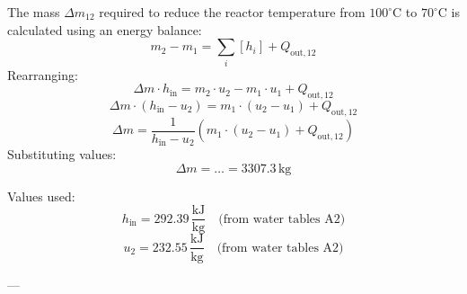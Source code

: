 The mass \( \Delta m_{12} \) required to reduce the reactor temperature from \( 100^\circ\text{C} \) to \( 70^\circ\text{C} \) is calculated using an energy balance:  
\[
m_2 - m_1 = \sum_i \left[ h_i \right] + Q_{\text{out},12}
\]  
Rearranging:  
\[
\Delta m \cdot h_{\text{in}} = m_2 \cdot u_2 - m_1 \cdot u_1 + Q_{\text{out},12}
\]  
\[
\Delta m \cdot \left( h_{\text{in}} - u_2 \right) = m_1 \cdot \left( u_2 - u_1 \right) + Q_{\text{out},12}
\]  
\[
\Delta m = \frac{1}{h_{\text{in}} - u_2} \left( m_1 \cdot \left( u_2 - u_1 \right) + Q_{\text{out},12} \right)
\]  
Substituting values:  
\[
\Delta m = \dots = 3307.3 \, \text{kg}
\]  

Values used:  
\[
h_{\text{in}} = 292.39 \, \frac{\text{kJ}}{\text{kg}} \quad \text{(from water tables A2)}
\]  
\[
u_2 = 232.55 \, \frac{\text{kJ}}{\text{kg}} \quad \text{(from water tables A2)}
\]  

---